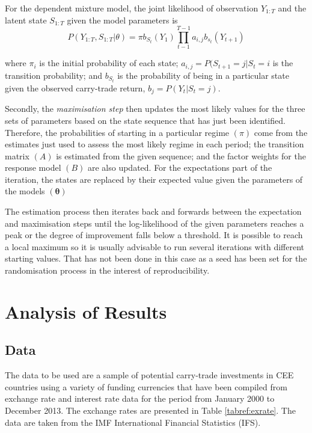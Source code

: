 \documentclass[12pt, a4paper, oneside]{article}\usepackage[]{graphicx}\usepackage[]{color}
\begin{document}
For the dependent mixture model, the joint likelihood of observation $Y_{1:T}$ and the latent state $S_{1:T}$ given the model parameters is 
\begin{equation}
P(Y_{1:T}, S_{1:T}|\theta) = \pi b_{S_t}(Y_1)\prod_{t-1}^{T-1} a_{i,j}b_{s_t}(Y_{t+1})
\end{equation}

where $\pi_i$ is the initial probability of each state; $a_{i,j} = P(S_{t+1} = j| S_t = i$ is the transition probability; and $b_{S_t}$ is the probability of being in a particular state given the observed carry-trade return, $b_j = P(Y_t|S_t = j)$.

Secondly, the \emph{maximisation step} then updates the most likely values for the three sets of parameters based on the state sequence that has just been identified. Therefore, the probabilities of starting in a particular regime $(\pi)$ come from the estimates just used to assess the most likely regime in each period; the transition matrix $(A)$ is estimated from the given sequence; and the factor weights for the response model $(B)$ are also updated. For the expectations part of the iteration, the states are replaced by their expected value given the parameters of the models $(\mathbf{\theta})$ 

The estimation process then iterates back and forwards between the expectation and maximisation steps until the log-likelihood of the given parameters reaches a peak or the degree of improvement falls below a threshold. It is possible to reach a local maximum so it is usually advisable to run several iterations with different starting values.  That has not been done in this case as a seed has been set for the randomisation process in the interest of reproducibility. 

\section{Analysis of Results}\label{secref:res}
\subsection{Data}
The data to be used are a sample of potential carry-trade investments in CEE countries using a variety of funding currencies that have been compiled from exchange rate and interest rate data for the period from January 2000 to December 2013. The exchange rates are presented in Table \ref{tabref:exrate}.  The data are taken from the IMF International Financial Statistics (IFS).  
\end{document}
